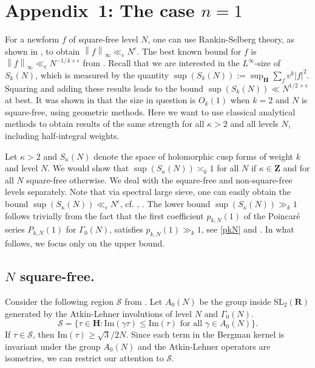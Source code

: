 \documentclass[11pt]{amsart}
\numberwithin{equation}{section}
\theoremstyle{plain}
\theoremstyle{definition}
\newcommand{\z}{\mf Z}
\newcommand{\h}{\mf H}
\newcommand{\mf}{\mathbf}
\newcommand{\mc}{\mathcal}
\newcommand{\mrm}{\mathrm}
\newcommand{\im}{\mrm{Im}}
\newcommand*{\norm}[1]{\left\lVert#1\right\rVert}
\newcommand{\sumn}{\sum \nolimits}
\newcommand{\sltwor}{\mrm{SL}_2(\mf R)}
\begin{document}
\section{Appendix~1: The case \texorpdfstring{$n=1$}{n=1}}\label{appendix}
For a newform $f$ of square-free level $N$, one can use Rankin-Selberg theory, as shown in \cite{blo-hol}, to obtain $\norm{f}_\infty \ll_\epsilon N^\epsilon$. The best known bound for $f$ is $\norm{f}_\infty \ll_\epsilon N^{-1/4+\epsilon}$ from  \cite{steiner}. Recall that we are interested in the $L^\infty$-size of $S_k(N)$, which is measured by the quantity $ \sup(S_k(N)):=\sup_\h \sumn_f v^k |f|^2 $. Squaring and adding these results leads to the bound $ \sup(S_k(N)) \ll N^{1/2+\epsilon} $ at best. It was
shown in \cite{jorgenson2004bounding} that the size in question is $O_k(1)$ when $k=2$ and $N$ is square-free, using geometric methods. Here we want to use classical analytical methods to obtain results of the same strength for all $\kappa > 2$ and all levels $N$, including half-integral weights. 

Let $\kappa>2$ and $S_\kappa(N)$ denote the space of holomorphic cusp forms of weight $k$ and level $N$. We would show that $\sup (S_\kappa(N)) \asymp_k 1$ for all $N$ if $\kappa \in \z$ and for all $N$ square-free otherwise.
We deal with the square-free and non-square-free levels separately. Note that via spectral large sieve, one can easily obtain the bound $\sup (S_\kappa(N)) \ll_\epsilon N^\epsilon$, cf. \cite{michel1998points}, \cite{lam2014local}. The lower bound $\sup (S_\kappa(N)) \gg_k 1$ follows trivially from the fact that the first coefficient $p_{k,N}(1)$ of the Poincar\'e series  $P_{k,N}(1)$ for $\Gamma_0(N)$, satisfies $p_{k,N}(1) \gg_k 1$, see \eqref{pkN} and \cite[Sec.~7.1]{sd-hk}. In what follows, we focus only on the upper bound.

\subsection{\texorpdfstring{$N$}{N} square-free.}
Consider the following region $\mc S$ from \cite{HT}. Let $A_0(N)$ be the group inside $\sltwor$ generated by the Atkin-Lehner involutions of level $N$ and $\Gamma_0(N)$.
\begin{equation}
    \mc S=\{\tau\in\h : \im ( \gamma\tau) \le \im (\tau) \text{ for all } \gamma\in A_0(N) \}.
\end{equation}
If $\tau \in \mc S$, then $\im (\tau) \ge \sqrt{3}/2N$. Since each term in the Bergman kernel is invariant under the group $A_0(N)$ and the Atkin-Lehner operators are isometries, we can restrict our attention to $\mc S$. 
\end{document}

